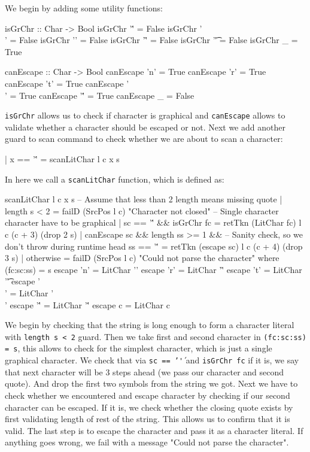 \documentclass{article}
\begin{document}
\begin{flushleft}
We begin by adding some utility functions:
\end{flushleft}
\begin{code}
isGrChr :: Char -> Bool
isGrChr '\'' = False
isGrChr '\\' = False
isGrChr '\n' = False
isGrChr '\r' = False
isGrChr '\t' = False
isGrChr _    = True

canEscape :: Char -> Bool
canEscape 'n'  = True
canEscape 'r'  = True
canEscape 't'  = True
canEscape '\\' = True
canEscape '\'' = True
canEscape _    = False
\end{code}
\begin{flushleft}
\texttt{isGrChr} allows us to check if character is graphical and \texttt{canEscape} allows to validate whether a character should be escaped or not. Next we add another guard to scan command to check whether we are about to scan a character:
\end{flushleft}
\begin{code}
| x == '\'' = scanLitChar l c x s
\end{code}
\begin{flushleft}
In here we call a \texttt{scanLitChar} function, which is defined as:
\end{flushleft}
\begin{code}
scanLitChar l c x s 
    -- Assume that less than 2 length means missing quote
    | length s < 2 = failD (SrcPos l c) "Character not closed"
    -- Single character character have to be graphical
    | sc == '\'' && isGrChr fc = retTkn (LitChar fc) l c (c + 3) (drop 2 s)
    | canEscape sc &&
        length ss >= 1 && -- Sanity check, so we don't throw during runtime
        head ss == '\'' = retTkn (escape sc) l c (c + 4) (drop 3 s)
    | otherwise    = failD (SrcPos l c) "Could not parse the character"
    where
        (fc:sc:ss) = s
        escape 'n'  = LitChar '\n'
        escape 'r'  = LitChar '\r'
        escape 't'  = LitChar '\t'
        escape '\\' = LitChar '\\'
        escape '\'' = LitChar '\''
        escape c    = LitChar c
\end{code}
\begin{flushleft}
We begin by checking that the string is long enough to form a character literal with \texttt{length s < 2} guard. Then we take first and second character in \texttt{(fc:sc:ss) = s}, this allows to check for the simplest character, which is just a single graphical character. We check that via \texttt{sc == '\''} and \texttt{isGrChr fc} if it is, we say that next character will be 3 steps ahead (we pass our character and second quote). And drop the first two symbols from the string we got. Next we have to check whether we encountered and escape character by checking if our second character can be escaped. If it is, we check whether the closing quote exists by first validating length of rest of the string. This allows us to confirm that it is valid. The last step is to escape the character and pass it as a character literal. If anything goes wrong, we fail with a message "Could not parse the character".
\end{flushleft}
\end{document}
